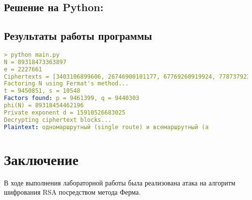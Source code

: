 \documentclass[a4paper, 14pt]{report}
\begin{document}
\section*{Решение на Python:}
{}



\section*{Результаты работы программы}
{}

\begin{lstlisting}[language=YAML, caption=Вывод в консоль]
> python main.py
N = 89318473363897
e = 2227661
Ciphertexts = [3403106899606, 26746900101177, 67769260919924, 77873792354218, 15782947730235, 15100267747684, 28877721728826, 62898555111378, 4989704651236, 55293402838380, 4108112294245, 8492269964172]
Factoring N using Fermat's method...
t = 9450851, s = 10548
Factors found: p = 9461399, q = 9440303
phi(N) = 89318454462196
Private exponent d = 15910526683025
Decrypting ciphertext blocks...
Plaintext: одномаршрутный (single route) и всемаршрутный (a
\end{lstlisting}
\chapter*{Заключение}
{}
В ходе выполнения лабораторной работы была реализована атака на алгоритм шифрования RSA посредством метода Ферма.
\end{document}
